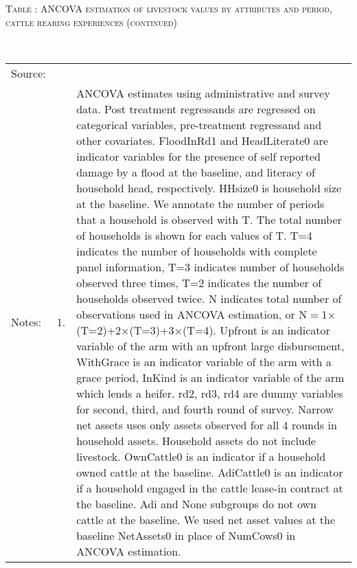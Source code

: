 \addtocounter{table}{-1}
\hspace{-1cm}\begin{minipage}[t]{14cm}
\hfil\textsc{\normalsize Table \thetable: ANCOVA estimation of livestock values by attributes and period, cattle rearing experiences (continued)\label{tab ANCOVA livestock values Experience timevarying attributes 2}}\\
\setlength{\tabcolsep}{1pt}
\setlength{\baselineskip}{8pt}
\renewcommand{\arraystretch}{.52}
\hfil{}\\
\renewcommand{\arraystretch}{.8}
\setlength{\tabcolsep}{1pt}
\begin{tabular}{>{\hfill\scriptsize}p{1cm}<{}>{\hfill\scriptsize}p{.25cm}<{}>{\scriptsize}p{12cm}<{\hfill}}
Source:& \multicolumn{2}{l}{\scriptsize Estimated with GUK administrative and survey data.}\\
Notes: & 1. & ANCOVA estimates using administrative and survey data. Post treatment regressands are regressed on categorical variables, pre-treatment regressand and other covariates. \textsf{FloodInRd1} and \textsf{HeadLiterate0} are indicator variables for the presence of self reported damage by a flood at the baseline, and literacy of household head, respectively. \textsf{HHsize0} is household size at the baseline. We annotate the number of periods that a household is observed with \textsf{T}. The total number of households is shown for each values of \textsf{T}. \textsf{T=4} indicates the number of households with complete panel information, \textsf{T=3} indicates number of households observed three times, \textsf{T=2} indicates the number of households observed twice. \textsf{N} indicates total number of observations used in ANCOVA estimation, or \textsf{N$=$1$\times$(T=2)+2$\times$(T=3)+3$\times$(T=4)}.  \textsf{Upfront} is an indicator variable of the arm with an upfront large disbursement, \textsf{WithGrace} is an indicator variable of the arm with a grace period, \textsf{InKind} is an indicator variable of the arm which lends a heifer. \textsf{rd2, rd3, rd4} are dummy variables for second, third, and fourth round of survey. Narrow net assets uses only assets observed for all 4 rounds in household assets. Household assets do not include livestock. \textsf{OwnCattle0} is an indicator if a household owned cattle at the baseline. \textsf{AdiCattle0} is an indicator if a household engaged in the cattle lease-in contract at the baseline.  \textsf{Adi} and \textsf{None} subgroups do not own cattle at the baseline. We used net asset values at the baseline \textsf{NetAssets0} in place of \textsf{NumCows0} in ANCOVA estimation.\\

\end{tabular}
\end{minipage}
